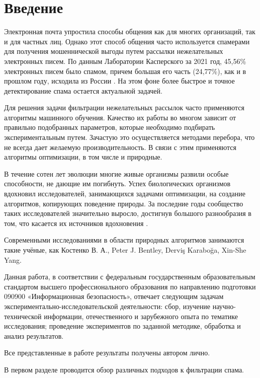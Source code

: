 \chapter*{Введение}

Электронная почта упростила способы общения как для многих организаций, так и для
частных лиц. Однако этот способ общения часто используется спамерами для получения
мошеннической выгоды путем рассылки нежелательных электронных писем. \cite{IEEE}
По данным Лаборатории Касперского за 2021 год, 45,56\% электронных писем было спамом, 
причем большая его часть (24,77\%), как и в прошлом году, исходила из России \cite{stat}. На этом фоне
более быстрое и точное детектирование спама остается актуальной задачей.

Для решения задачи фильтрации нежелательных рассылок часто применяются
алгоритмы машинного обучения. Качество их работы во многом зависит от правильно
подобранных параметров, которые необходимо подбирать экспериментальным путем.
Зачастую это осуществляется методами перебора, что не всегда дает желаемую
производительность. В связи с этим применяются алгоритмы оптимизации, в том числе
и природные.

В течение сотен лет эволюции многие живые организмы развили особые способности,
не дающие им погибнуть. Успех биологических организмов вдохновил исследователей,
занимающихся задачами оптимизации, на создание алгоритмов,
копирующих поведение природы. За последние годы сообщество таких исследователей
значительно выросло, достигнув большого разнообразия в том, что касается их
источников вдохновения \cite{BioInspiredTaxonomy}.

Современными исследованиями в области природных алгоритмов занимаются такие учёные, как Костенко В. А., 
Peter J. Bentley, Derviş Karaboğa, Xin-She Yang.

Данная работа, в соответствии с федеральным государственным образовательным стандартом высшего профессионального
образования по направлению подготовки 090900 «Информационная безопасность», отвечает следующим задачам
экспериментально-исследовательской деятельности: сбор, изучение научно-технической информации, отечественного и
зарубежного опыта по тематике исследования; проведение экспериментов по заданной методике, обработка и анализ результатов.

Все представленные в работе результаты получены автором лично.

В первом разделе проводится обзор различных подходов к фильтрации спама.

